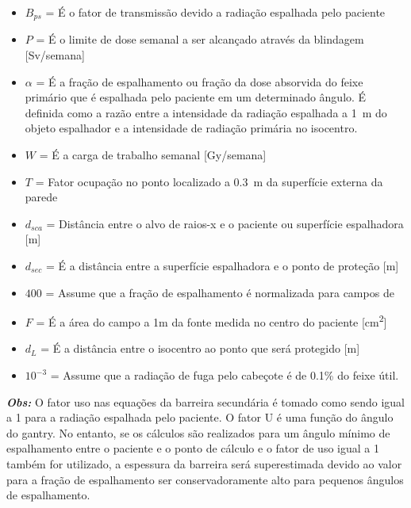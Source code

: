 \documentclass[11pt,a4paper]{article}
\begin{document}
            \begin{itemize}
                \item $B_{ps}$ = É o fator de transmissão devido a radiação espalhada pelo paciente
                
                \item $P$ = É o limite de dose semanal a ser alcançado através da blindagem [\unit{Sv/semana}]
                
                \item $\alpha$ = É a fração de espalhamento ou fração da dose absorvida do feixe primário que é espalhada pelo paciente em um determinado ângulo. É definida como a razão entre a intensidade da radiação espalhada a \qty{1}{m} do objeto espalhador e a intensidade de radiação primária no isocentro.
                
                \item $W$ = É a carga de trabalho semanal [\unit{Gy/semana}] 
                
                \item $T$ = Fator ocupação no ponto localizado a \qty{0.3}{m} da superfície externa da parede
                
                \item $d_{sca}$ = Distância entre o alvo de raios-x e o paciente ou superfície espalhadora [\unit{m}]
                
                \item $d_{sec}$ = É a distância entre a superfície espalhadora e o ponto de proteção [\unit{m}]
                
                \item $400$ = Assume que a fração de espalhamento é normalizada para campos de 
                
                \item $F$ = É a área do campo a 1m da fonte medida no centro do paciente [\unit{cm^2}]
                
                \item $d_L$ = É a distância entre o isocentro ao ponto que será protegido [\unit{m}]
                
                \item $10^{-3}$ = Assume que a radiação de fuga pelo cabeçote é de 0.1\% do feixe útil.
            \end{itemize}

            
            \textbf{\textit{\textcolor{CarnationPink}{Obs:}}} O fator uso nas equações da barreira secundária é tomado como sendo igual a 1 para a radiação espalhada pelo paciente. O fator U é uma função do ângulo do gantry. No entanto, se os cálculos são realizados para um ângulo mínimo de espalhamento entre o paciente e o ponto de cálculo e o fator de uso igual a 1 também for utilizado, a espessura da barreira será superestimada devido ao valor para a fração de espalhamento ser conservadoramente alto para pequenos ângulos de espalhamento. 
\end{document}
